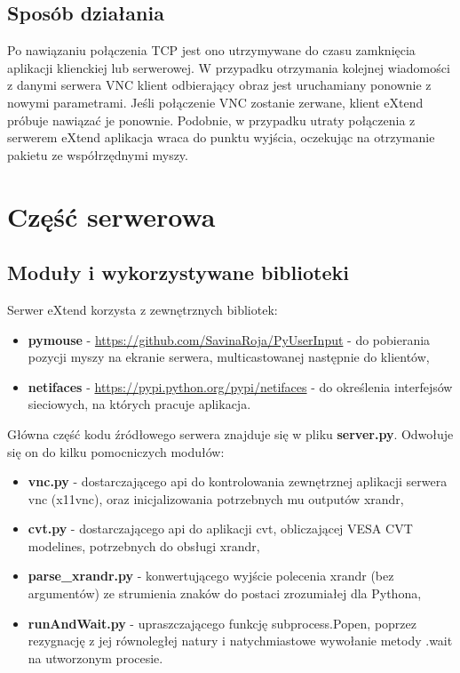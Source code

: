   \subsection{Sposób działania}


    Po nawiązaniu połączenia TCP jest ono utrzymywane do czasu zamknięcia aplikacji klienckiej lub serwerowej. W przypadku otrzymania kolejnej wiadomości z danymi serwera VNC klient odbierający obraz jest uruchamiany ponownie z nowymi parametrami. Jeśli połączenie VNC zostanie zerwane, klient eXtend próbuje nawiązać je ponownie. Podobnie, w przypadku utraty połączenia z serwerem eXtend aplikacja wraca do punktu wyjścia, oczekując na otrzymanie pakietu ze współrzędnymi myszy.

\section{Część serwerowa}

  \subsection{Moduły i wykorzystywane biblioteki}

    Serwer eXtend korzysta z zewnętrznych bibliotek:

    \begin{itemize}
      \item \textbf{pymouse} - \url{https://github.com/SavinaRoja/PyUserInput} - do pobierania pozycji myszy na ekranie serwera, multicastowanej następnie do klientów,
      \item \textbf{netifaces} - \url{https://pypi.python.org/pypi/netifaces} - do określenia interfejsów sieciowych, na których pracuje aplikacja.
    \end{itemize}

    Główna część kodu źródłowego serwera znajduje się w pliku \textbf{server.py}. Odwołuje się on do kilku pomocniczych modułów:

    \begin{itemize}
      \item \textbf{vnc.py} - dostarczającego api do kontrolowania zewnętrznej aplikacji serwera vnc (x11vnc), oraz inicjalizowania potrzebnych mu outputów xrandr,
      \item \textbf{cvt.py} - dostarczającego api do aplikacji cvt, obliczającej VESA CVT modelines, potrzebnych do obsługi xrandr,
      \item \textbf{parse\_xrandr.py} - konwertującego wyjście polecenia xrandr (bez argumentów) ze strumienia znaków do postaci zrozumiałej dla Pythona,
      \item \textbf{runAndWait.py} - upraszczającego funkcję subprocess.Popen, poprzez rezygnację z jej równoległej natury i natychmiastowe wywołanie metody .wait na utworzonym procesie.
    \end{itemize}

